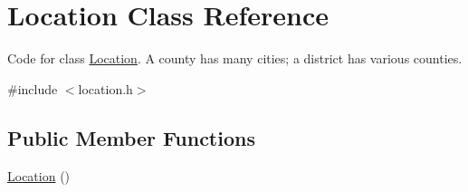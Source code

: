 \hypertarget{class_location}{}\section{Location Class Reference}
\label{class_location}


Code for class \hyperlink{class_location}{Location}. A county has many cities; a district has various counties.  




{\ttfamily \#include $<$location.\+h$>$}

\subsection*{Public Member Functions}
\begin{DoxyCompactItemize}
\item 
\hypertarget{class_location_a87790c14997fd8cdd12080c78c9794bb}{}\hyperlink{class_location_a87790c14997fd8cdd12080c78c9794bb}{Location} ()\label{class_location_a87790c14997fd8cdd12080c78c9794bb}


\end{DoxyCompactItemize}
